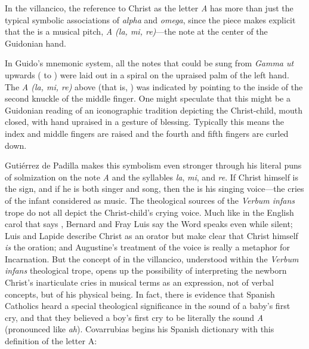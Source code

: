 In the villancico, the reference to Christ as the letter \emph{A} has more than
just the typical symbolic associations of \emph{alpha} and \emph{omega}, since
the piece makes explicit that the  is a musical pitch, \emph{A (la,
mi, re)}---the note at the center of the Guidonian hand.%
\begin{Footnote}
    In Guido's mnemonic system, all the notes that could be sung from
    \emph{Gamma ut} upwards ( to ) were laid out in a
    spiral on the upraised palm of the left hand.
    The \emph{A (la, mi, re)} above  (that is, )
    was indicated by pointing to the inside of the second knuckle of the middle
    finger.
    One might speculate that this might be a Guidonian reading of an
    iconographic tradition depicting the Christ-child, mouth closed, with hand
    upraised in a gesture of blessing.
    Typically this means the index and middle fingers are raised and the fourth
    and fifth fingers are curled down.
\end{Footnote}
Gutiérrez de Padilla makes this symbolism even stronger through his literal puns
of solmization on the note \emph{A} and the syllables \emph{la}, \emph{mi}, and
\emph{re}.
If Christ himself is the sign, and if he is both singer and song, then the
 is his singing voice---the cries of the infant considered as
music.
The theological sources of the \emph{Verbum infans} trope do not all depict the
Christ-child's crying voice.
Much like in the English carol that says , Bernard and Fray Luis say the Word speaks even while silent; Luis and
Lapide describe Christ as an orator but make clear that Christ himself \emph{is}
the oration; and Augustine's treatment of the voice is really a metaphor for
Incarnation.
But the concept of  in the villancico, understood within
the \emph{Verbum infans} theological trope, opens up the possibility of
interpreting the newborn Christ's inarticulate cries in musical terms as an
expression, not of verbal concepts, but of his physical being.
In fact, there is evidence that Spanish Catholics heard a special theological
significance in the sound of a baby's first cry, and that they believed a boy's
first cry to be literally the sound \emph{A} (pronounced like \emph{ah}).
Covarrubias begins his Spanish dictionary with this definition of the letter A:

